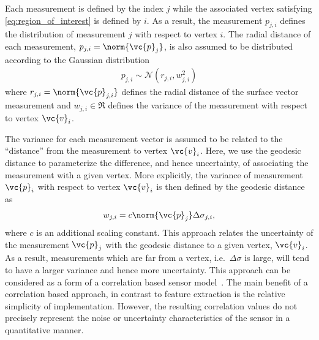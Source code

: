 \documentclass[smallextended]{svjour3}       %
\begin{document}
Each measurement is defined by the index \( j \) while the associated vertex satisfying \cref{eq:region_of_interest} is defined by \( i \). 
As a result, the measurement \( p_{j, i} \) defines the distribution of measurement \( j \) with respect to vertex \( i \). 
The radial distance of each measurement, \( p_{j,i} = \norm{\vc{p}_j}\), is also assumed to be distributed according to the Gaussian distribution
\begin{align*}
    p_{j,i} \sim \mathcal{N}(r_{j,i}, w_{j,i}^2)
\end{align*}
where \( r_{j,i} = \norm{\vc{p}_{j,i}} \) defines the radial distance of the surface vector measurement and \( w_{j, i} \in\Re\) defines the variance of the measurement with respect to vertex \( \vc{v}_i\).

The variance for each measurement vector is assumed to be related to the ``distance'' from the measurement to vertex \( \vc{v}_i \).
Here, we use the geodesic distance to parameterize the difference, and hence  uncertainty, of associating the measurement with a given vertex.
More explicitly, the variance of measurement \( \vc{p}_i \) with respect to vertex \( \vc{v}_i \) is then defined by the geodesic distance as
\begin{align}
    w_{j, i} = c \norm{\vc{p}_j} \Delta \sigma_{j,i} ,
\end{align}
where \( c \) is an additional scaling constant.
This approach relates the uncertainty of the measurement \( \vc{p}_j \) with the geodesic distance to a given vertex, \( \vc{v}_i \).
As a result, measurements which are far from a vertex, i.e.\ \( \Delta \sigma \) is large, will tend to have a larger variance and hence more uncertainty. 
This approach can be considered as a form of a correlation based sensor model~\cite{thrun2005}.
The main benefit of a correlation based approach, in contrast to feature extraction is the relative simplicity of implementation.
However, the resulting correlation values do not precisely represent the noise or uncertainty characteristics of the sensor in a quantitative manner.

\end{document}
